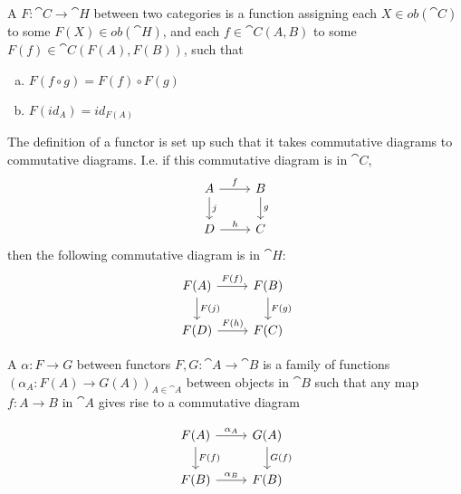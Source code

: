 \begin{definition}
A  $F:\cat{C}\rightarrow\cat{H}$ between two categories is a function assigning each $X\in ob(\cat{C})$ to some $F(X)\in ob(\cat{H})$, and each $f\in \cat{C}(A,B)$ to some $F(f)\in \cat{C}(F(A),F(B))$, such that
\begin{enumerate}[(a)]
\item $F(f\circ g)=F(f)\circ F(g)$
\item $F(id_A)=id_{F(A)}$
\end{enumerate}
\end{definition}

The definition of a functor is set up such that it takes commutative diagrams to commutative diagrams. I.e. if this commutative diagram is in $\cat{C}$,
\[\begin{tikzcd}
A \arrow[r, "f"] \arrow[d, "j"] & B \arrow[d, "g"] \\
D \arrow[r, "h"]                & C               
\end{tikzcd}\]
then the following commutative diagram is in $\cat{H}$:
\[\begin{tikzcd}
F(A) \arrow[r, "F(f)"] \arrow[d, "F(j)"] & F(B) \arrow[d, "F(g)"] \\
F(D) \arrow[r, "F(h)"]                   & F(C)                  
\end{tikzcd}\]


\begin{definition}
A  $\alpha:F\rightarrow G$ between functors $F,G:\cat{A}\rightarrow \cat{B}$ is a family of functions $(\alpha_A:F(A)\rightarrow G(A))_{A\in \cat{A}}$ between objects in $\cat{B}$ such that any map $f:A\rightarrow B$ in $\cat{A}$ gives rise to a commutative diagram

\[\begin{tikzcd}
F(A) \arrow[r, "\alpha_A"] \arrow[d, "F(f)"] & G(A) \arrow[d, "G(f)"] \\
F(B) \arrow[r, "\alpha_B"]                   & F(B)                  
\end{tikzcd}\]
\end{definition}

